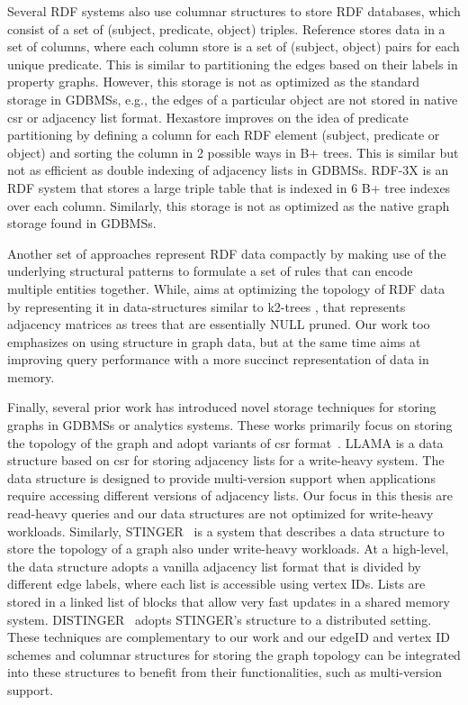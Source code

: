 Several RDF systems also use columnar structures to store RDF databases, which consist of a set of (subject, predicate, object) triples. Reference \cite{rdf-vertical} stores data in a set of columns, where each column store is a set of (subject, object) pairs for each unique predicate. This is similar to partitioning the edges based on their labels in property graphs. However, this storage is not as optimized as the standard storage in GDBMSs, e.g., the edges of a particular object are not stored in native \gls{csr} or adjacency list format. Hexastore \cite{hexastore} improves on the idea of predicate partitioning by defining a column for each RDF element (subject, predicate or object) and sorting the column in 2 possible ways in B+ trees. This is similar but not as efficient as double indexing of adjacency lists in GDBMSs. RDF-3X \cite{rdf-3x} is an RDF system that stores a large triple table that is indexed in 6 B+ tree indexes over each column. Similarly, this storage is not as optimized as the native graph storage found in GDBMSs.

Another set of approaches \cite{comp-rdf, rbcomp, hdt} represent RDF data compactly by making use of the underlying structural patterns to formulate a set of rules that can encode multiple entities together. While, \cite{k2triples, ik2trees} aims at optimizing the topology of RDF data by representing it in data-structures similar to k2-trees \cite{k2trees}, that represents adjacency matrices as trees that are essentially NULL pruned. Our work too emphasizes on using structure in graph data, but at the same time aims at improving query performance with a more succinct representation of data in memory.

Finally, several prior work has introduced novel storage techniques for storing graphs in GDBMSs or analytics systems. These works primarily focus on storing the topology of the graph and adopt variants of \gls{csr} format~\cite{yale}. LLAMA is a data structure based on \gls{csr} for storing adjacency lists for a write-heavy system. The data structure is designed to provide multi-version support when applications require accessing different versions of adjacency lists. Our focus in this thesis are read-heavy queries and our data structures are not optimized for write-heavy workloads. Similarly, STINGER~\cite{stinger} is a system that describes a data structure to store the topology of a graph also under write-heavy workloads. At a high-level, the data structure adopts a vanilla adjacency list format that is divided by different edge labels, where each list is accessible using vertex IDs. Lists are stored in a linked list of blocks that allow very fast updates in a shared memory system. DISTINGER~\cite{distinger} adopts STINGER's structure to a distributed setting. These techniques are complementary to our work and our edgeID and vertex ID schemes and columnar structures for storing the graph topology can be integrated into these structures to benefit from their functionalities, such as multi-version support. 